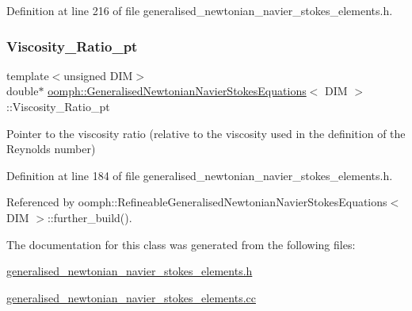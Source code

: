 Definition at line 216 of file generalised\+\_\+newtonian\+\_\+navier\+\_\+stokes\+\_\+elements.\+h.

\mbox{\label{classoomph_1_1GeneralisedNewtonianNavierStokesEquations_a14a357f03b102d42fc0e6eb7b539a504}} 
\subsubsection{\texorpdfstring{Viscosity\+\_\+\+Ratio\+\_\+pt}{Viscosity\_Ratio\_pt}}
{\footnotesize\ttfamily template$<$unsigned D\+IM$>$ \\
double$\ast$ \hyperlink{classoomph_1_1GeneralisedNewtonianNavierStokesEquations}{oomph\+::\+Generalised\+Newtonian\+Navier\+Stokes\+Equations}$<$ D\+IM $>$\+::Viscosity\+\_\+\+Ratio\+\_\+pt\hspace{0.3cm}{\ttfamily [protected]}}



Pointer to the viscosity ratio (relative to the viscosity used in the definition of the Reynolds number) 



Definition at line 184 of file generalised\+\_\+newtonian\+\_\+navier\+\_\+stokes\+\_\+elements.\+h.



Referenced by oomph\+::\+Refineable\+Generalised\+Newtonian\+Navier\+Stokes\+Equations$<$ D\+I\+M $>$\+::further\+\_\+build().



The documentation for this class was generated from the following files\+:\begin{DoxyCompactItemize}
\item 
\hyperlink{generalised__newtonian__navier__stokes__elements_8h}{generalised\+\_\+newtonian\+\_\+navier\+\_\+stokes\+\_\+elements.\+h}\item 
\hyperlink{generalised__newtonian__navier__stokes__elements_8cc}{generalised\+\_\+newtonian\+\_\+navier\+\_\+stokes\+\_\+elements.\+cc}\end{DoxyCompactItemize}
